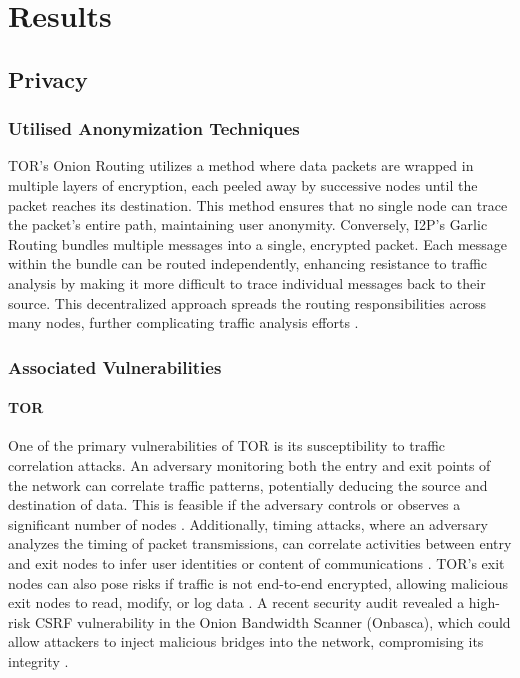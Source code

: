 \documentclass[12pt,conference]{IEEEtran}
\begin{document}
\section{Results}
\subsection{Privacy}
\subsubsection{Utilised Anonymization Techniques}
TOR's Onion Routing utilizes a method where data packets are wrapped in multiple layers of encryption, each peeled away by successive nodes until the packet reaches its destination. This method ensures that no single node can trace the packet's entire path, maintaining user anonymity. Conversely, I2P's Garlic Routing bundles multiple messages into a single, encrypted packet. Each message within the bundle can be routed independently, enhancing resistance to traffic analysis by making it more difficult to trace individual messages back to their source. This decentralized approach spreads the routing responsibilities across many nodes, further complicating traffic analysis efforts \cite{aSurveyOnTORAndI2P}\cite{TORVsI2P}\cite{torAttacks}.
\subsubsection{Associated Vulnerabilities}
\paragraph{TOR} One of the primary vulnerabilities of TOR is its susceptibility to traffic correlation attacks. An adversary monitoring both the entry and exit points of the network can correlate traffic patterns, potentially deducing the source and destination of data. This is feasible if the adversary controls or observes a significant number of nodes \cite{TORVsI2P}. Additionally, timing attacks, where an adversary analyzes the timing of packet transmissions, can correlate activities between entry and exit nodes to infer user identities or content of communications \cite{aSurveyOnTORAndI2P}. TOR's exit nodes can also pose risks if traffic is not end-to-end encrypted, allowing malicious exit nodes to read, modify, or log data \cite{TORVsI2P}. A recent security audit revealed a high-risk CSRF vulnerability in the Onion Bandwidth Scanner (Onbasca), which could allow attackers to inject malicious bridges into the network, compromising its integrity \cite{torCodeAudits}.
\end{document}
